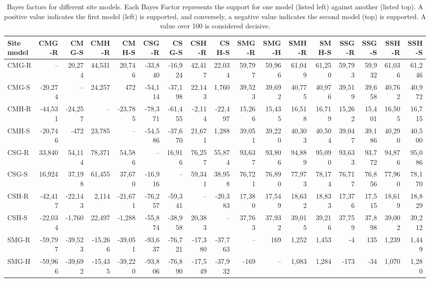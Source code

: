 \documentclass[]{article}
\begin{document}
\begin{landscape}\begin{table}

\caption{\label{tab:site-models}Bayes factors for different site models. Each Bayes Factor represents the support for one model (listed left) against another (listed top). A positive value indicates the first model (left) is supported, and conversely, a negative value indicates the second model (top) is supported. A value over 100 is considered decisive.}
\centering
\fontsize{8}{10}\selectfont
\begin{tabular}[t]{lrrrrrrrrrrrrrrrr}
\toprule
Site model & CMG-R & CMG-S & CMH-R & CMH-S & CSG-R & CSG-S & CSH-R & CSH-S & SMG-R & SMG-H & SMH-R & SMH-S & SSG-R & SSG-S & SSH-R & SSH-S\\
\midrule
CMG-R & -- & 20,274 & 44,531 & 20,746 & -33,840 & -16,924 & 42,417 & 22,034 & 59,797 & 59,966 & 61,049 & 61,250 & 59,793 & 59,932 & 61,036 & 61,246\\
CMG-S & -20,274 & -- & 24,257 & 472 & -54,114 & -37,198 & 22,143 & 1,760 & 39,523 & 39,692 & 40,775 & 40,976 & 39,519 & 39,658 & 40,762 & 40,972\\
CMH-R & -44,531 & -24,257 & -- & -23,785 & -78,371 & -61,455 & -2,114 & -22,497 & 15,266 & 15,435 & 16,518 & 16,719 & 15,262 & 15,401 & 16,505 & 16,715\\
CMH-S & -20,746 & -472 & 23,785 & -- & -54,586 & -37,670 & 21,671 & 1,288 & 39,051 & 39,220 & 40,303 & 40,504 & 39,047 & 39,186 & 40,290 & 40,500\\
\addlinespace
CSG-R & 33,840 & 54,114 & 78,371 & 54,586 & -- & 16,916 & 76,257 & 55,874 & 93,637 & 93,806 & 94,889 & 95,090 & 93,633 & 93,772 & 94,876 & 95,086\\
CSG-S & 16,924 & 37,198 & 61,455 & 37,670 & -16,916 & -- & 59,341 & 38,958 & 76,721 & 76,890 & 77,973 & 78,174 & 76,717 & 76,856 & 77,960 & 78,170\\
CSH-R & -42,417 & -22,143 & 2,114 & -21,671 & -76,257 & -59,341 & -- & -20,383 & 17,380 & 17,549 & 18,632 & 18,833 & 17,376 & 17,515 & 18,619 & 18,829\\
CSH-S & -22,034 & -1,760 & 22,497 & -1,288 & -55,874 & -38,958 & 20,383 & -- & 37,763 & 37,932 & 39,015 & 39,216 & 37,759 & 37,898 & 39,002 & 39,212\\
\addlinespace
SMG-R & -59,797 & -39,523 & -15,266 & -39,051 & -93,637 & -76,721 & -17,380 & -37,763 & -- & 169 & 1,252 & 1,453 & -4 & 135 & 1,239 & 1,449\\
SMG-H & -59,966 & -39,692 & -15,435 & -39,220 & -93,806 & -76,890 & -17,549 & -37,932 & -169 & -- & 1,083 & 1,284 & -173 & -34 & 1,070 & 1,280\\

\end{tabular}
\end{table}
\end{landscape}
\end{document}
